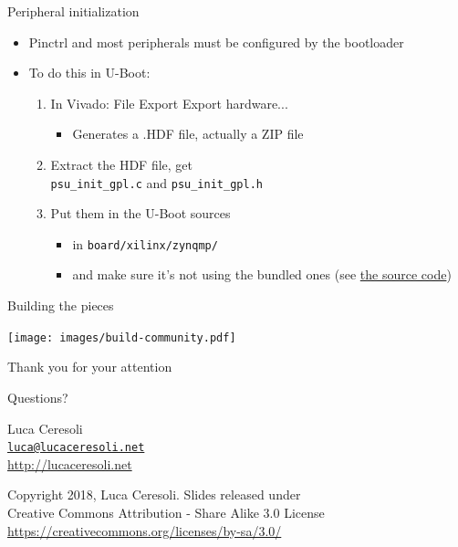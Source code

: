 \documentclass[xetex,table]{beamer}
\begin{document}
\begin{frame}{Peripheral initialization}
  \begin{itemize}
  \item Pinctrl and most peripherals must be configured by the
    bootloader
  \item To do this in U-Boot:
    \begin{enumerate}
    \item In Vivado: File \textrightarrow{} Export \textrightarrow{}
      Export hardware...
      \begin{itemize}
      \item Generates a .HDF file, actually a ZIP file
      \end{itemize}
    \item Extract the HDF file, get\\
      {\tt psu\_init\_gpl.c} and {\tt psu\_init\_gpl.h}
    \item Put them in the U-Boot sources
      \begin{itemize}
      \item in {\tt board/xilinx/zynqmp/}
      \item and make sure it's not using the bundled ones (see
        \href{https://github.com/xilinx/u-boot-xlnx/tree/a703fb6e3c6c5a7f57321e258a58d241e2afdc45/board/xilinx/zynqmp}{the
          source code})
      \end{itemize}
    \end{enumerate}
  \end{itemize}
\end{frame}

\begin{frame}{Building the pieces}
  \begin{center}
    \texttt{[image: images/build-community.pdf]}
  \end{center}
\end{frame}

\begin{frame}
  \begin{center}
    Thank you for your attention

    \vspace{0.15\textheight}

    {\Huge Questions?}

    \vspace{0.15\textheight}

    {\Large Luca Ceresoli}\\
    \href{mailto:luca@lucaceresoli.net}{\tt luca@lucaceresoli.net}\\
    \url{http://lucaceresoli.net}

    \vspace{0.05\textheight}

    \tiny
    \textcopyright{} Copyright 2018, Luca Ceresoli.
    Slides released under\\
    Creative Commons Attribution - Share Alike 3.0 License \\
    \url{https://creativecommons.org/licenses/by-sa/3.0/} \\
  \end{center}
\end{frame}
\end{document}

